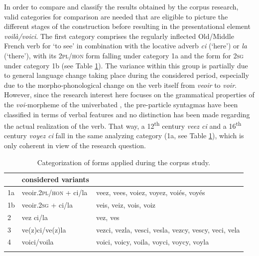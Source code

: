 \documentclass[output=paper,colorlinks,citecolor=brown]{langscibook}
\begin{document}
In order to compare and classify the results obtained by the corpus research, valid categories for comparison are needed that are eligible to picture the different stages of the construction before resulting in the presentational element \emph{voilà/voici}. The first category comprises the regularly inflected Old/Middle French verb for `to see' in combination with the locative adverb \emph{ci} (`here') or \emph{la} (`there'), with its \textsc{2pl/hon} form falling under category 1a and the form for \textsc{2sg} under category 1b (see Table \ref{07tab2}). The variance within this group is partially due to general language change taking place during the considered period, especially due to the morpho-phonological change on the verb itself from \emph{veoir} to \emph{voir}. However, since the research interest here focuses on the grammatical properties of the \emph{voi-}morpheme of the univerbated , the pre-particle syntagmas have been classified in terms of verbal features and no distinction has been made regarding the actual realization of the verb. That way, a 12\textsuperscript{th} century \emph{veez ci} and a 16\textsuperscript{th} century \emph{voyez ci} fall in the same analyzing category (1a, see Table \ref{07tab2}), which is only coherent in view of the research question.

\begin{table}[ht]
	\centering
	\begin{tabularx}{\textwidth}{lll}
		\lsptoprule
			\multicolumn{2}{l}{category} & considered variants \\
			\midrule
			1a & veoir.\textsc{2pl/hon} + ci/la & veez, vees, voiez, voyez, voiés, voyés \\
			1b & veoir.\textsc{2sg} + ci/la & veis, veiz, vois, voiz \\
			2 & vez ci/la & vez, ves \\
			3 & ve(z)ci/ve(z)la & vezci, vezla, vesci, vesla, vezcy, vescy, veci, vela \\
			4 & voici/voila & voici, voicy, voila, voyci, voycy, voyla \\
		\lspbottomrule
	\end{tabularx}
	\caption{Categorization of  forms applied during the corpus study.}
	\label{07tab2}
\end{table}
\end{document}
